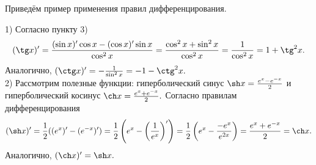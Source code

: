 Приведём пример применения правил дифференцирования.
\begin{example}
1) Согласно пункту 3)
$$
(\tg x)'=\frac{(\sin x)'
\cos x-(\cos x)'\sin x}{\cos^2x}=
\frac{\cos^2x+\sin^2x}{\cos^2x}=\frac{1}{\cos^2x}
=1+\tg^2x.
$$
Аналогично, $(\ctg x)'=
-\frac{1}{\sin^2x}=-1-\ctg^2x.$\\
2) Рассмотрим полезные функции: гиперболический
синус $\sh x=\frac{e^x-e^{-x}}{2}$ и
гиперболический косинус $\ch x=
\frac{e^x+e^{-x}}{2}.$ Согласно правилам
дифференцирования
$$
(\sh x)'=\frac{1}{2}((e^x)'-(e^{-x})')=
\frac{1}{2}\left(e^x-\left(\frac{1}{e^x}
\right)'\right)=\frac{1}{2}
\left(e^x-\frac{-e^x}{e^{2x}}\right)=
\frac{e^x+e^{-x}}{2}=\ch x.
$$
Аналогично, $(\ch x)'=\sh x.$
\end{example}

\newpage

